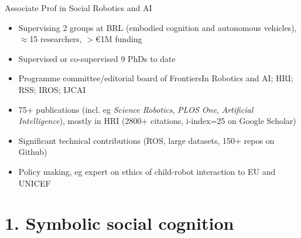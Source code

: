 \documentclass[xcolor=table]{beamer}
\begin{document}

\begin{frame}{Associate Prof in Social Robotics and AI}
    \begin{itemize}
        \item Supervising 2 groups at BRL (embodied cognition and autonomous
            vehicles), $\approx$15 researchers, $>$€1M funding
        \item Supervised or co-supervised 9 PhDs to date
        \item Programme committee/editorial board of FrontiersIn Robotics and
            AI; HRI; RSS; IROS; IJCAI
        \item 75+ publications (incl. eg \emph{Science Robotics}, \emph{PLOS One},
            \emph{Artificial Intelligence}), mostly in HRI (2800+ citations, i-index=25 on Google Scholar)
        \item Significant technical contributions (ROS, large datasets, 150+
            repos on Github)
        \item Policy making, eg expert on ethics of child-robot interaction to EU and UNICEF
    \end{itemize}

\end{frame}







\section{1. Symbolic social cognition}
\end{document}
